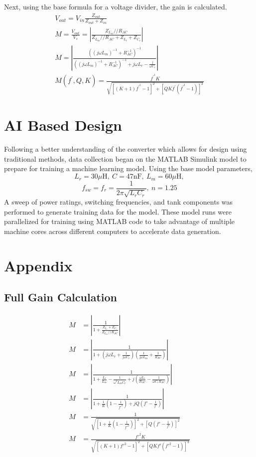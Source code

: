 \documentclass[conference]{IEEEtran}
\begin{document}
Next, using the base formula for a voltage divider, the gain is calculated.
\begin{gather*}
	V_{out} = V_{in}\frac{Z_{out}}{Z_{out}+Z_{in}}\\
	M = \frac{V_{out}}{V_s}= \left|\frac{Z_{L_m}//R_{AC}} {Z_{L_m} // R_{AC} + Z_{L_r} + Z_{C_r}} \right|\\
	M = \left| \frac{\left((j\omega L_m)^{-1} + R_{AC}^{-1}\right)^{-1}}{\left((j\omega L_m)^{-1} + R_{AC}^{-1}\right)^{-1} + j\omega L_r - \frac{j}{\omega C_r}} \right|\\
	M(f^\prime,Q,K) = \frac{f^{\prime^2}K}{\sqrt{\left[(K + 1)f^{\prime^2} - 1\right]^2 + \left[QKf^\prime(f^{\prime^2} - 1)\right]^2}}
\end{gather*}

\section{AI Based Design}

Following a better understanding of the converter which allows for design using traditional methods, data collection began on the MATLAB Simulink model to prepare for training a machine learning model.
Using the base model parameters,
\[L_r = 30\mu\text{H},\ C=47\text{nF},\ L_m = 60\mu\text{H},\]
\[f_{sw}=f_{r}=\frac{1}{2\pi\sqrt{L_rC_r}},\ n=1.25\]
A sweep of power ratings, switching frequencies, and tank components was performed to generate training data for the model.
These model runs were parallelized for training using MATLAB code to take advantage of multiple machine cores across different computers to accelerate data generation.

%

\newpage
\section{Appendix}
\subsection{Full Gain Calculation}
\begin{align*}
	M &= \left| \frac{1}{1 + \frac{Z_{L_r} + Z_{C_r}}{Z_{L_m} // R_{AC}}} \right| \\
	M &= \left| \frac{1}{1 + (j\omega L_r + \frac{1}{j\omega C_r})(\frac{1}{j\omega L_m} + \frac{1}{R_{AC}})} \right| \\
	M &= \left| \frac{1}{1 + \frac{L_r}{L_m} - \frac{1}{\omega^2 L_m C_r} + j(\frac{\omega L_r}{R_{AC}} - \frac{1}{\omega C_r R_{AC}})} \right| \\
	M &= \left| \frac{1}{1 + \frac{1}{K} (1 - \frac{1}{f'^2}) + j Q (f' - \frac{1}{f'})} \right| \\
	M &= \frac{1}{\sqrt{\left[ 1 + \frac{1}{K} \left( 1 - \frac{1}{f'^2} \right) \right]^2 + \left[ Q \left( f' - \frac{1}{f'} \right) \right]^2}} \\
	M &= \frac{f'^2 K}{\sqrt{[(K+1)f'^2 - 1]^2 + [QKf'(f'^2 - 1)]^2}}
\end{align*}
\end{document}
